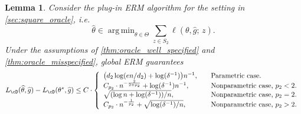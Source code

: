 \documentclass[11pt]{article} %
\newcommand{\pref}[1]{\cref{#1}}
\theoremstyle{theorem}  %
\newtheorem{lemma}{Lemma}
\theoremstyle{plain}
\DeclarePairedDelimiter{\prn}{(}{)}
\DeclareMathOperator*{\argmin}{arg\,min} %
\newcommand{\ls}{\ell}
\newcommand{\wh}[1]{\widehat{#1}}
\newcommand{\midsem}{;\,}
\newcommand{\poprisk}{L_{\cD}}
\newcommand{\estone}{\wh{g}}
\newcommand{\esttwo}{\wh{\theta}}
\newcommand{\ptwo}{p_2}
\newcommand{\dtwo}{d_2}
\newcommand{\target}{\Theta}
\newcommand{\besttwo}{\theta^{\star}}
\newcommand{\sampletwo}{S_2}
\begin{document}
\begin{lemma}
\label{lem:erm}
Consider the plug-in ERM algorithm for the setting in \pref{sec:square_oracle}, i.e.
\[
\esttwo \in \argmin_{\theta\in\target}\sum_{z\in\sampletwo}\ls(\theta,\estone\midsem{}z).
\]
Under the assumptions of \pref{thm:oracle_well_specified} and \pref{thm:oracle_misspecified}, global ERM guarantees
\[
\poprisk(\esttwo,\estone)-\poprisk(\besttwo,\estone) \leq C\cdot\left\{
\begin{array}{ll}
\prn*{\dtwo\log(en/\dtwo) + \log(\delta^{-1})}n^{-1},\quad&\text{Parametric case.}\\
C_{\ptwo}\cdot{}n^{-\frac{2}{2+\ptwo}} + \log(\delta^{-1})n^{-1},\quad&\text{Nonparametric case, $\ptwo<2$.}\\
\sqrt{(\log{}n + \log(\delta^{-1}))/n},\quad&\text{Nonparametric case, $\ptwo=2$.}\\
C_{\ptwo}\cdot{}n^{-\frac{1}{\ptwo}} + \sqrt{\log(\delta^{-1})/n},\quad&\text{Nonparametric case, $\ptwo>2$.}
\end{array}
\right.
\]

\end{lemma}
\end{document}
